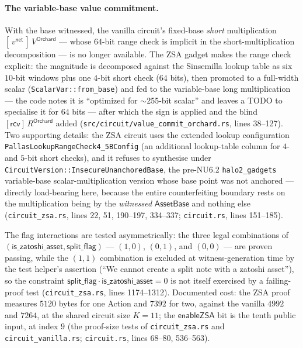 \documentclass[11pt,a4paper]{article}
\theoremstyle{definition}
\newcommand{\rcv}{\ensuremath{\mathsf{rcv}}}
\begin{document}
\paragraph{The variable-base value commitment.} With the base witnessed,
the vanilla circuit's fixed-base \emph{short} multiplication
$[\,v^{\mathsf{net}}\,]\,V^{\mathsf{Orchard}}$ --- whose $64$-bit range
check is implicit in the short-multiplication decomposition --- is no
longer available. The ZSA gadget makes the range check explicit: the
magnitude is decomposed against the Sinsemilla lookup table as six
$10$-bit windows plus one $4$-bit short check ($64$ bits), then promoted
to a full-width scalar (\texttt{ScalarVar::from\_base}) and fed to the
variable-base long multiplication --- the code notes it is ``optimized
for $\sim$255-bit scalar'' and leaves a TODO to specialise it for $64$
bits --- after which the sign is applied and the blind
$[\rcv]\,R^{\mathsf{Orchard}}$ added
(\texttt{src/circuit/value\_commit\_orchard.rs}, lines 38--127). Two
supporting details: the ZSA circuit uses the extended lookup
configuration \texttt{PallasLookupRangeCheck4\_5BConfig} (an additional
lookup-table column for $4$- and $5$-bit short checks), and it refuses to
synthesise under \texttt{CircuitVersion::InsecureUnanchoredBase}, the
pre-NU6.2 \texttt{halo2\_gadgets} variable-base scalar-multiplication
version whose base point was not anchored --- directly load-bearing here,
because the entire counterfeiting boundary rests on the multiplication
being by the \emph{witnessed} $\mathsf{AssetBase}$ and nothing else
(\texttt{circuit\_zsa.rs}, lines 22, 51, 190--197, 334--337;
\texttt{circuit.rs}, lines 151--185).

The flag interactions are tested asymmetrically: the three legal
combinations of $(\mathsf{is\_zatoshi\_asset}, \mathsf{split\_flag})$ ---
$(1,0)$, $(0,1)$, and $(0,0)$ --- are proven passing, while the $(1,1)$
combination is excluded at witness-generation time by the test helper's
assertion (``We cannot create a split note with a zatoshi asset''), so
the constraint $\mathsf{split\_flag} \cdot \mathsf{is\_zatoshi\_asset} =
0$ is not itself exercised by a failing-proof test
(\texttt{circuit\_zsa.rs}, lines 1174--1312). Documented cost: the ZSA
proof measures $5120$ bytes for one Action and $7392$ for two, against
the vanilla $4992$ and $7264$, at the shared circuit size $K = 11$; the
$\mathsf{enableZSA}$ bit is the tenth public input, at index $9$ (the
proof-size tests of \texttt{circuit\_zsa.rs} and
\texttt{circuit\_vanilla.rs}; \texttt{circuit.rs}, lines 68--80,
536--563).
\end{document}
